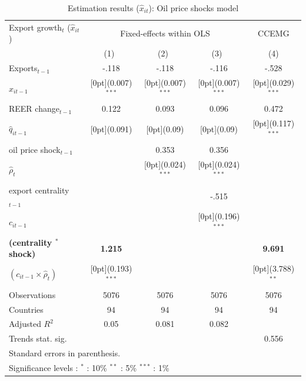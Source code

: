 \documentclass[10pt,letterpaper]{article}
\begin{document}
\begin{table}[!htb]\centering
\caption{Estimation results ($\hat{x}_{it}$): Oil price shocks model
\label{tab:OilShocksModel}}
\begin{tabular*}{0.8\textwidth}{@{\extracolsep{\fill}}lcccc}				
Export growth$_t$ ($\hat{x}_{it}$)	& \multicolumn{3}{c}{Fixed-effects within OLS} &	\multicolumn{1}{c}{CCEMG} \\
\cline{2-5}				
	& \multicolumn{1}{c}{(1)\mbox{\ }} &	\multicolumn{1}{c}{(2)\mbox{\ }} &	\multicolumn{1}{c}{(3)\mbox{\ }} &	\multicolumn{1}{c}{(4)} \\
\hline				
Exports$_{t-1}$ &	-.118 &	-.118 &	-.116 &	-.528 \\
\quad $x_{it-1}$ &	\raisebox{.7ex}[0pt]{\scriptsize (0.007)$^{***}$} &	\raisebox{.7ex}[0pt]{\scriptsize (0.007)$^{***}$} &	\raisebox{.7ex}[0pt]{\scriptsize (0.007)$^{***}$} &	\raisebox{.7ex}[0pt]{\scriptsize (0.029)$^{***}$} \\
REER change$_{t-1}$ &	0.122 &	0.093 &	0.096 &	0.472 \\
\quad $\hat{q}_{it-1}$ &	\raisebox{.7ex}[0pt]{\scriptsize (0.091)} &	\raisebox{.7ex}[0pt]{\scriptsize (0.09)} &	\raisebox{.7ex}[0pt]{\scriptsize (0.09)} &	\raisebox{.7ex}[0pt]{\scriptsize (0.117)$^{***}$} \\
oil price shock$_{t-1}$ &	&	0.353 &	0.356 &	\\
\quad $\hat{\rho}_{t}$ &	&	\raisebox{.7ex}[0pt]{\scriptsize (0.024)$^{***}$} &	\raisebox{.7ex}[0pt]{\scriptsize (0.024)$^{***}$} &	\\
export centrality$_{t-1}$ &	&	&	-.515 &	\\
\quad $c_{it-1}$&	&	&	\raisebox{.7ex}[0pt]{\scriptsize (0.196)$^{***}$} &	\\
\textbf{(centrality $^*$ shock)} &	\textbf{1.215} &	&	&	\textbf{9.691} \\
\quad $(c_{it-1} \times \hat{\rho}_{t})$&	\raisebox{.7ex}[0pt]{\scriptsize (0.193)$^{***}$} &	&	&	\raisebox{.7ex}[0pt]{\scriptsize (3.788)$^{**}$} \\
\hline
Observations &	5076 &	5076 &	5076 &	5076 \\
Countries &	94 &	94 &	94 &	94 \\
Adjusted $R^2$ &	0.05 &	0.081 &	0.082 &	\\
Trends stat. sig. &	&	&	&	0.556 \\
\hline\hline	
\multicolumn{5}{l}{\footnotesize{Standard errors in parenthesis.}}\\
\multicolumn{5}{l}{\footnotesize{Significance levels
:\hspace{1em} $^{*}$ : 10\% \hspace{1em}
$^{**}$ : 5\% \hspace{1em} $^{***}$ : 1\% \normalsize}}					
\end{tabular*}%
\end{table}
\end{document}
